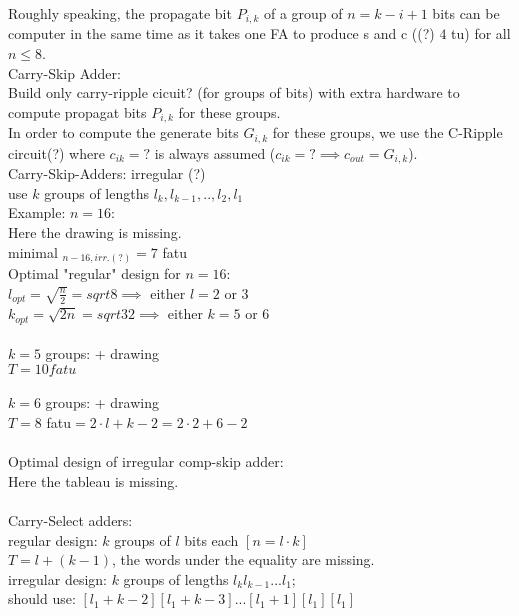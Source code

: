 Roughly speaking, the propagate bit $P_{i,k}$ of a group of $n=k-i+1$ bits can be computer in the same time as it takes one FA to produce s and c ((?) $4$ tu) for all $n\le 8$. \\

Carry-Skip Adder: \\
Build only carry-ripple cicuit? (for groups of bits) with extra hardware to compute propagat bits $P_{i,k}$ for these groups. \\

In order to compute the generate bits $G_{i,k}$ for these groups, we use the C-Ripple circuit(?) where $c_{ik}=?$ is always assumed ($c_{ik}=? \implies c_{out}=G_{i,k}$). \\
Carry-Skip-Adders: irregular (?) \\
use $k$ groups of lengths $l_k,l_{k-1},..,l_2,l_1$ \\
Example: $n=16:$ \\

Here the drawing is missing. \\

minimal $_{n-16, irr.(?)}=7$ fatu \\

Optimal "regular" design for $n=16:$ \\
$l_{opt}=\sqrt{\frac{n}{2}}=sqrt{8} \implies $ either $l=2$ or $3$ \\
$k_{opt}=\sqrt{2n}=sqrt{32} \implies $ either $k=5$ or $6$  \\
\\
$k=5$ groups: + drawing \\
$T=10 fatu$ \\
\\
$k=6$ groups: + drawing \\
$T=8$ fatu$=2\cdot l +k-2=2\cdot 2+6-2$ \\
\\

Optimal design of irregular comp-skip adder: \\
Here the tableau is missing. \\

\\
Carry-Select adders: \\
regular design: $k$ groups of $l$ bits each $[n=l\cdot k]$ \\
$T=l+(k-1)$, the words under the equality are missing. \\

irregular design: $k$ groups of lengths $l_kl_{k-1}...l_1;$ \\
should use: $[l_1+k-2][l_1+k-3]...[l_1+1][l_1][l_1]$ \\

